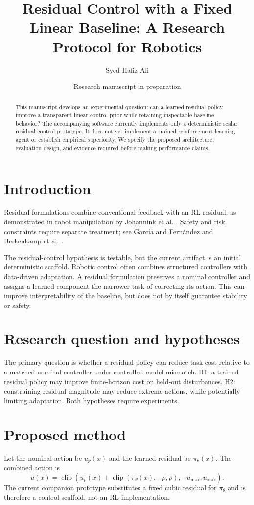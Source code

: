 \documentclass[11pt]{article}
\title{Residual Control with a Fixed Linear Baseline: A Research Protocol for Robotics}
\author{Syed Hafiz Ali}
\date{Research manuscript in preparation}
\begin{document}
\maketitle
\begin{abstract}
This manuscript develops an experimental question: can a learned residual policy improve a transparent linear control prior while retaining inspectable baseline behavior? The accompanying software currently implements only a deterministic scalar residual-control prototype. It does not yet implement a trained reinforcement-learning agent or establish empirical superiority. We specify the proposed architecture, evaluation design, and evidence required before making performance claims.
\end{abstract}
\section{Introduction}
Residual formulations combine conventional feedback with an RL residual, as demonstrated in robot manipulation by Johannink et al. \cite{johannink2019residual}. Safety and risk constraints require separate treatment; see García and Fernández \cite{garcia2015safe} and Berkenkamp et al. \cite{berkenkamp2017safe}.

The residual-control hypothesis is testable, but the current artifact is an initial deterministic scaffold. Robotic control often combines structured controllers with data-driven adaptation. A residual formulation preserves a nominal controller and assigns a learned component the narrower task of correcting its action. This can improve interpretability of the baseline, but does not by itself guarantee stability or safety.
\section{Research question and hypotheses}
The primary question is whether a residual policy can reduce task cost relative to a matched nominal controller under controlled model mismatch. H1: a trained residual policy may improve finite-horizon cost on held-out disturbances. H2: constraining residual magnitude may reduce extreme actions, while potentially limiting adaptation. Both hypotheses require experiments.
\section{Proposed method}
Let the nominal action be $u_p(x)$ and the learned residual be $\pi_\theta(x)$. The combined action is
\[
u(x)=\operatorname{clip}(u_p(x)+\operatorname{clip}(\pi_\theta(x),-\rho,\rho),-u_{\max},u_{\max}).
\]
The current companion prototype substitutes a fixed cubic residual for $\pi_\theta$ and is therefore a control scaffold, not an RL implementation.
\end{document}

